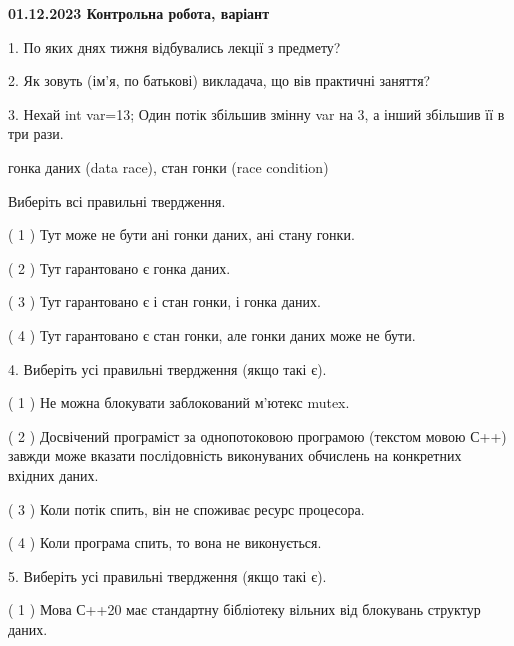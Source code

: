 \documentclass[12pt, ukrainian]{article}
\begin{document}
\vspace{4mm}
\newpage
\begin {large}

\textbf{01.12.2023 Контрольна робота, варіант  }\par


{
1. По яких днях тижня відбувались лекції з предмету?



\vspace{5mm}
2. Як зовуть (ім'я, по батькові) викладача, що вів практичні заняття?



\vspace{5mm}
3. Нехай int var=13; Один потік збільшив змінну var на 3, а інший збільшив її в три рази.

гонка даних (data race), стан гонки (race condition)

Виберіть всі правильні твердження.\par
\vspace{2mm}
( 1 ) Тут може не бути ані гонки даних, ані стану гонки.%

( 2 ) Тут гарантовано є гонка даних.%

( 3 ) Тут гарантовано є і стан гонки, і гонка даних.%

( 4 ) Тут гарантовано є стан гонки, але гонки даних може не бути.%


\vspace{5mm}
4. Виберіть усі правильні твердження (якщо такі є).\par
\vspace{2mm}

( 1 ) Не можна блокувати заблокований м’ютекс mutex.%

( 2 ) Досвічений програміст за однопотоковою програмою (текстом мовою С++) завжди може вказати послідовність виконуваних обчислень на конкретних вхідних даних.%

( 3 ) Коли потік спить, він не споживає ресурс процесора.%

( 4 ) Коли програма спить, то вона не виконується.%


\vspace{5mm}
5. Виберіть усі правильні твердження (якщо такі є).\par
\vspace{2mm}

( 1 ) Мова С++20 має стандартну бібліотеку вільних від блокувань структур даних.%

}
\end{large}
\end{document}
